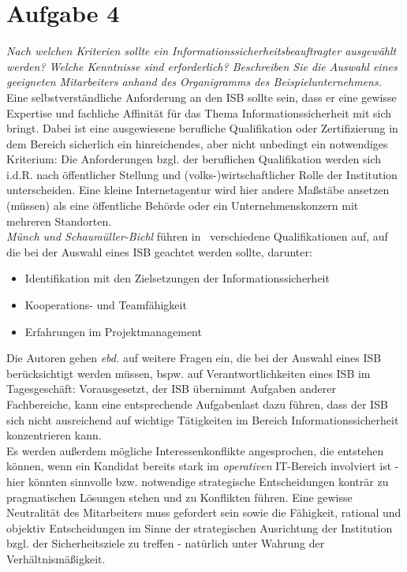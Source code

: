 \chapter{Aufgabe 4}

\textit{Nach welchen Kriterien sollte ein Informationssicherheitsbeauftragter ausgewählt
werden? Welche Kenntnisse sind erforderlich? Beschreiben Sie die Auswahl eines
geeigneten Mitarbeiters anhand des Organigramms des Beispielunternehmens.}\\

\noindent
Eine selbstverständliche Anforderung an den ISB sollte sein, dass er eine gewisse Expertise und fachliche Affinität für das Thema Informationssicherheit mit sich bringt.
Dabei ist eine ausgewiesene berufliche Qualifikation oder Zertifizierung in dem Bereich sicherlich ein hinreichendes, aber nicht unbedingt ein notwendiges Kriterium: Die Anforderungen bzgl. der beruflichen Qualifikation werden sich i.d.R. nach öffentlicher Stellung und (volks-)wirtschaftlicher Rolle der Institution unterscheiden.
Eine kleine Internetagentur wird hier andere Maßstäbe ansetzen (müssen) als eine öffentliche Behörde oder ein Unternehmenskonzern mit mehreren Standorten.\\

\noindent
\textit{Münch und Schaumüller-Bichl} führen in~\cite[43]{ITS2} verschiedene Qualifikationen auf, auf die bei der Auswahl eines ISB geachtet werden sollte, darunter:

\begin{itemize}
\itemsep0.5em
\item Identifikation mit den Zielsetzungen der Informationssicherheit
\item Kooperations- und Teamfähigkeit
\item Erfahrungen im Projektmanagement
\end{itemize}

Die Autoren gehen \textit{ebd.} auf weitere Fragen ein, die bei der Auswahl eines ISB berücksichtigt werden müssen, bspw. auf Verantwortlichkeiten eines ISB im Tagesgeschäft:
Vorausgesetzt, der ISB übernimmt Aufgaben anderer Fachbereiche, kann eine entsprechende Aufgabenlast dazu führen, dass der ISB sich nicht ausreichend auf wichtige Tätigkeiten im Bereich Informationssicherheit konzentrieren kann.\\
Es werden außerdem mögliche Interessenkonflikte angesprochen, die entstehen können, wenn ein Kandidat bereits stark im \textit{operativen} IT-Bereich involviert ist - hier könnten sinnvolle bzw. notwendige strategische Entscheidungen konträr zu pragmatischen Lösungen stehen und zu Konflikten führen.
Eine gewisse Neutralität des Mitarbeiters muss gefordert sein sowie die Fähigkeit, rational und objektiv Entscheidungen im Sinne der strategischen Ausrichtung der Institution bzgl. der Sicherheitsziele zu treffen - natürlich unter Wahrung der Verhältnismäßigkeit.\\

